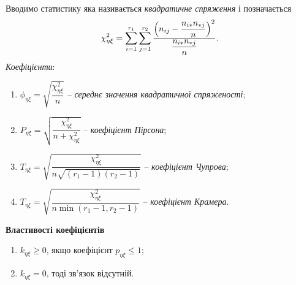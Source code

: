 Вводимо статистику яка називається \textit{квадратичне спряження} і позначається \[ \chi_{\eta\xi}^2 = \displaystyle\sum\limits_{i=1}^{r_1} \displaystyle\sum\limits_{j=1}^{r_2} \dfrac{\left(n_{ij}-\dfrac{n_{i*}n_{*j}}{n}\right)^2}{\dfrac{n_{i*}n_{*j}}{n}}. \]
\textit{Коефіцієнти}:
\begin{enumerate}
	\item $\phi_{\eta\xi} = \sqrt{\dfrac{\chi_{\eta\xi}^2}{n}}$ -- \textit{середнє значення квадратичної спряженості};
	\item $P_{\eta\xi}=\sqrt{\dfrac{\chi_{\eta\xi}^2}{n+\chi_{\eta\xi}^2}}$ -- \textit{коефіцієнт Пірсона};
	\item $T_{\eta\xi}=\sqrt{\dfrac{\chi_{\eta\xi}^2}{n\sqrt{(r_1-1)(r_2-1)}}}$ -- \textit{коефіцієнт Чупрова};
	\item $T_{\eta\xi}=\sqrt{\dfrac{\chi_{\eta\xi}^2}{n\min(r_1-1,r_2-1)}}$ -- \textit{коефіцієнт Крамера}.
\end{enumerate}
\textbf{Властивості коефіцієнтів}
\begin{enumerate}
	\item $k_{\eta\xi}\ge0$, якщо коефіцієнт $p_{\eta\xi} \le 1$;
	\item $k_{\eta\xi}=0$, тоді зв'язок відсутній.
\end{enumerate}